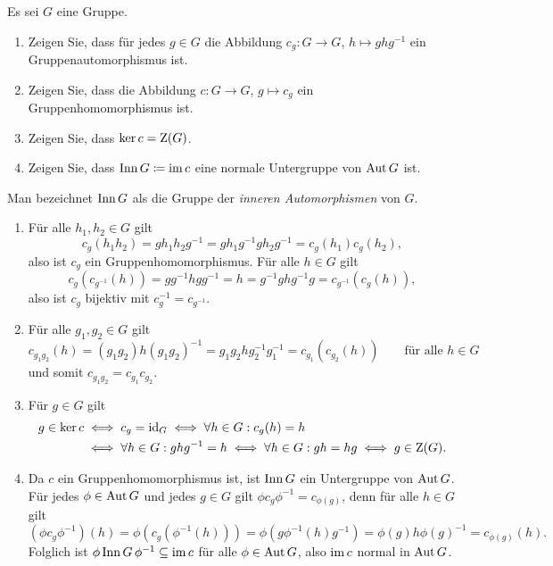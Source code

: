 \begin{question}[subtitle = Innere Automorphismen]
  Es sei $G$ eine Gruppe.
  \begin{enumerate}
    \item
      Zeigen Sie, dass für jedes $g \in G$ die Abbildung $c_g \colon G \to G$, $h \mapsto g h g^{-1}$ ein Gruppenautomorphismus ist.
    \item
      Zeigen Sie, dass die Abbildung $c \colon G \to G$, $g \mapsto c_g$ ein Gruppenhomomorphismus ist.
    \item
      Zeigen Sie, dass $\ker c = \operatorname{Z}(G)$.
    \item
      Zeigen Sie, dass $\operatorname{Inn} G \coloneqq \operatorname{im} c$ eine normale Untergruppe von $\operatorname{Aut} G$ ist.
  \end{enumerate}
  Man bezeichnet $\operatorname{Inn} G$ als die Gruppe der \emph{inneren Automorphismen} von $G$.
\end{question}


\begin{solution}
  \begin{enumerate}
    \item
      Für alle $h_1, h_2 \in G$ gilt
      \[
          c_g(h_1 h_2)
        = g h_1 h_2 g^{-1}
        = g h_1 g^{-1} g h_2 g^{-1}
        = c_g(h_1) c_g(h_2),
      \]
      also ist $c_g$ ein Gruppenhomomorphismus.
      Für alle $h \in G$ gilt
      \[
          c_g( c_{g^{-1}}(h) )
        = g g^{-1} h g g^{-1}
        = h
        = g^{-1} g h g^{-1} g
        = c_{g^{-1}}( c_g(h) ),
      \]
      also ist $c_g$ bijektiv mit $c_g^{-1} = c_{g^{-1}}$.
    \item
      Für alle $g_1, g_2 \in G$ gilt
      \[
          c_{g_1 g_2}(h)
        = (g_1 g_2) h (g_1 g_2)^{-1}
        = g_1 g_2 h g_2^{-1} g_1^{-1}
        = c_{g_1}( c_{g_2}(h) )
        \qquad
        \text{für alle $h \in G$}
      \]
      und somit $c_{g_1 g_2} = c_{g_1} c_{g_2}$.
    \item
      Für $g \in G$ gilt
      \begin{align*}
              g \in \ker c
        &\iff c_g = \operatorname{id}_G
         \iff \forall h \in G: c_g(h) = h
        \\
        &\iff \forall h \in G: ghg^{-1} = h
         \iff \forall h \in G: gh = hg
         \iff g \in \operatorname{Z}(G).
      \end{align*}
    \item
      Da $c$ ein Gruppenhomomorphismus ist, ist $\operatorname{Inn} G$ ein Untergruppe von $\operatorname{Aut} G$.
      Für jedes $\phi \in \operatorname{Aut} G$ und jedes $g \in G$ gilt $\phi c_g \phi^{-1} = c_{\phi(g)}$, denn für alle $h \in G$ gilt
      \[
        (\phi c_g \phi^{-1})(h)
        = \phi( c_g( \phi^{-1}(h) ) )
        = \phi(g \phi^{-1}(h) g^{-1})
        = \phi(g) h \phi(g)^{-1}
        = c_{\phi(g)}(h).
      \]
      Folglich ist $\phi \, {\operatorname{Inn} G} \, \phi^{-1} \subseteq \operatorname{im} c$ für alle $\phi \in \operatorname{Aut} G$, also $\operatorname{im} c$ normal in $\operatorname{Aut} G$.
  \end{enumerate}
\end{solution}


